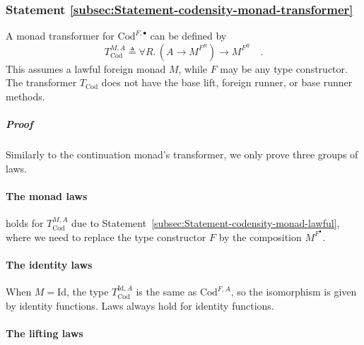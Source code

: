 \subsubsection{Statement \label{subsec:Statement-codensity-monad-transformer}\ref{subsec:Statement-codensity-monad-transformer}}

A monad transformer for $\text{Cod}^{F,\bullet}$ can be defined by
\[
T_{\text{Cod}}^{M,A}\triangleq\forall R.\,(A\rightarrow M^{F^{R}})\rightarrow M^{F^{R}}\quad.
\]
This assumes a lawful foreign monad $M$, while $F$ may be any type
constructor. The transformer $T_{\text{Cod}}$ does not have the base
lift, foreign runner, or base runner methods.

\subparagraph{Proof }

Similarly to the continuation monad\textsf{'}s transformer, we only prove three
groups of laws.

\paragraph{The monad laws}

holds for $T_{\text{Cod}}^{M,A}$ due to Statement~\ref{subsec:Statement-codensity-monad-lawful},
where we need to replace the type constructor $F$ by the composition
$M^{F^{\bullet}}$.

\paragraph{The identity laws}

When $M=\text{Id}$, the type $T_{\text{Cod}}^{\text{Id},A}$ is the
same as $\text{Cod}^{F,A}$, so the isomorphism is given by identity
functions. Laws always hold for identity functions.

\paragraph{The lifting laws}

